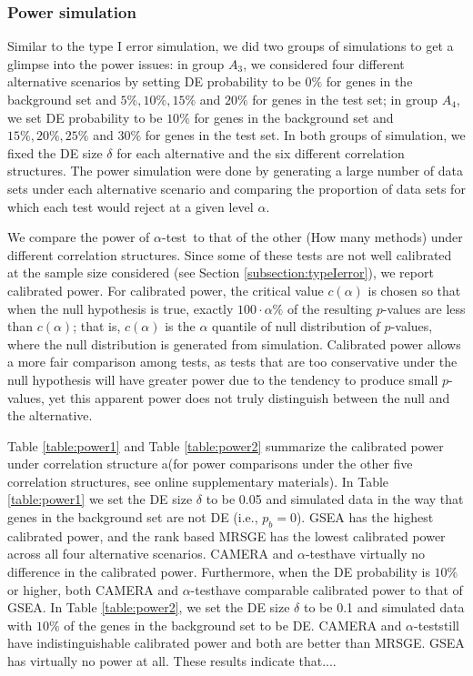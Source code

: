 \documentclass[useAMS,usenatbib, galley]{biom}
\newcommand{\OurMethod}{$\alpha$-test}
\newcommand{\aaCase}{a}
\begin{document}
	
	\subsubsection{Power simulation}\label{subsection:power}		 
	Similar to the type I error simulation, we did two groups of simulations to get a glimpse into the power issues: in group $A_3$, we considered four different alternative scenarios by setting DE probability to be $0\%$ for genes in the background set and $5\%, 10\%, 15\%$ and $20\%$ for genes in the test set; in group $A_4$, we set DE probability to be $10\%$ for genes in the background set and $15\%, 20\%, 25\%$ and $30\%$ for genes in the test set. In both groups of simulation, we fixed the DE size $\delta$ for each alternative and the six different correlation structures. The power simulation were done by generating a large number of data sets under each alternative scenario and comparing the proportion of data sets for which each test would reject at a given level $\alpha$. 
	
	We compare the power of \OurMethod~to that of the other (How many methods) under different correlation structures. Since some of these tests are not well calibrated at the sample size considered (see Section \ref{subsection:typeIerror}), we report calibrated power. For calibrated power, the critical value $c(\alpha)$ is chosen so that when the null hypothesis is true, exactly $100\cdot\alpha\%$ of the resulting $p$-values are less than $c(\alpha)$; that is, $c(\alpha)$ is  the $\alpha$ quantile of null distribution of $p$-values, where the null distribution is generated from simulation. Calibrated power allows a more fair comparison among tests, as tests that are too conservative under the null hypothesis will have greater power due to the tendency to produce small $p$-values, yet this apparent power does not truly distinguish between the null and the alternative.  
	
	Table \ref{table:power1} and Table \ref{table:power2} summarize the calibrated power under correlation structure \aaCase (for power comparisons under the other five correlation structures, see online supplementary materials). In Table \ref{table:power1} we set the DE size $\delta$ to be 0.05 and simulated data in the way that genes in the background set are not DE (i.e., $p_b=0$). GSEA has the highest calibrated power, and the rank based MRSGE has the lowest calibrated power across all four alternative scenarios. CAMERA and \OurMethod have virtually no difference in the calibrated power.  Furthermore, when the DE probability is $10\%$ or higher, both CAMERA and \OurMethod have comparable calibrated power to that of GSEA. In Table \ref{table:power2}, we set the DE size $\delta$ to be 0.1 and simulated data with $10\%$ of the genes in the background set to be DE. CAMERA and \OurMethod still have indistinguishable calibrated power and both are better than MRSGE. GSEA has virtually no power at all. These results indicate that....
	
\end{document}
